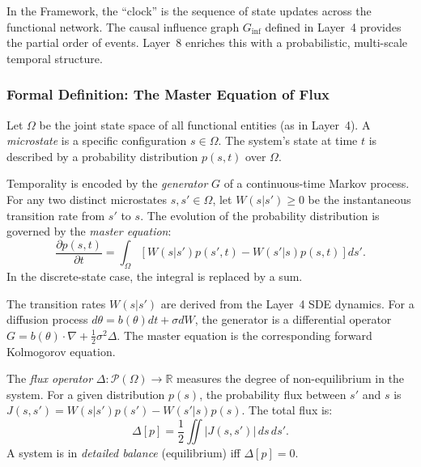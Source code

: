In the \Apeiron{} Framework, the ``clock'' is the sequence of state updates across the functional network. The causal influence graph $G_{\text{inf}}$ defined in Layer~4 provides the partial order of events. Layer~8 enriches this with a probabilistic, multi-scale temporal structure.

\subsubsection{Formal Definition: The Master Equation of Flux}
\begin{definition}
Let $\Omega$ be the joint state space of all functional entities (as in Layer~4). A \emph{microstate} is a specific configuration $s \in \Omega$. The system's state at time $t$ is described by a probability distribution $p(s, t)$ over $\Omega$.
\end{definition}

\begin{definition}
Temporality is encoded by the \emph{generator} $G$ of a continuous-time Markov process. For any two distinct microstates $s, s' \in \Omega$, let $W(s|s') \ge 0$ be the instantaneous transition rate from $s'$ to $s$. The evolution of the probability distribution is governed by the \emph{master equation}:
\[
\frac{\partial p(s, t)}{\partial t} = \int_{\Omega} \left[ W(s|s') p(s', t) - W(s'|s) p(s, t) \right] ds'.
\]
In the discrete-state case, the integral is replaced by a sum.
\end{definition}

The transition rates $W(s|s')$ are derived from the Layer~4 SDE dynamics. For a diffusion process $d\theta = b(\theta)dt + \sigma dW$, the generator is a differential operator $G = b(\theta) \cdot \nabla + \frac{1}{2} \sigma^2 \Delta$. The master equation is the corresponding forward Kolmogorov equation.

\begin{definition}
The \emph{flux operator} $\Delta: \mathcal{P}(\Omega) \to \mathbb{R}$ measures the degree of non-equilibrium in the system. For a given distribution $p(s)$, the probability flux between $s'$ and $s$ is $J(s, s') = W(s|s') p(s') - W(s'|s) p(s)$. The total flux is:
\[
\Delta[p] = \frac{1}{2} \iint |J(s, s')| \, ds \, ds'.
\]
A system is in \emph{detailed balance} (equilibrium) iff $\Delta[p] = 0$.
\end{definition}

